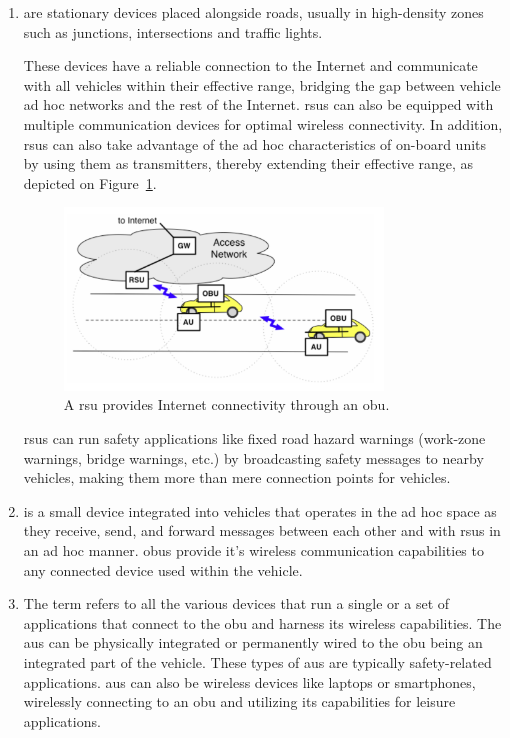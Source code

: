 \begin{enumerate}
	\item {} are stationary devices placed alongside roads, usually in high-density zones such as junctions, intersections and traffic lights.

    These devices have a reliable connection to the Internet and communicate with all vehicles within their effective range, bridging the gap between vehicle ad hoc networks and the rest of the Internet. \glspl{rsu} can also be equipped with multiple communication devices for optimal wireless connectivity. In addition, \glspl{rsu} can also take advantage of the ad hoc characteristics of on-board units by using them as transmitters, thereby extending their effective range, as depicted on Figure~\ref{fig:RSU_range}.

    \begin{figure}[htbp]
    	\centering
    	\includegraphics[width=0.8\textwidth]{Chapters/Figures/VANETs/c2c-cc_RSU_range.png}
    	\caption{A \gls{rsu} provides Internet connectivity through an \gls{obu}.~\cite{c2c-cc_car_2007}}
    	\label{fig:RSU_range}
    \end{figure}

    \glspl{rsu} can run safety applications like fixed road hazard warnings (work-zone warnings, bridge warnings, etc.) by broadcasting safety messages to nearby vehicles, making them more than mere connection points for vehicles.
    
	\item {} is a small device integrated into vehicles that operates in the ad hoc space as they receive, send, and forward messages between each other and with \glspl{rsu} in an ad hoc manner. \glspl{obu} provide it's wireless communication capabilities to any connected device used within the vehicle.
 
	\item The term  refers to all the various devices that run a single or a set of applications that connect to the \gls{obu} and harness its wireless capabilities. The \glspl{au} can be physically integrated or permanently wired to the \gls{obu} being an integrated part of the vehicle. These types of \glspl{au} are typically safety-related applications. \glspl{au} can also be wireless devices like laptops or smartphones, wirelessly connecting to an \gls{obu} and utilizing its capabilities for leisure applications.


\end{enumerate}

